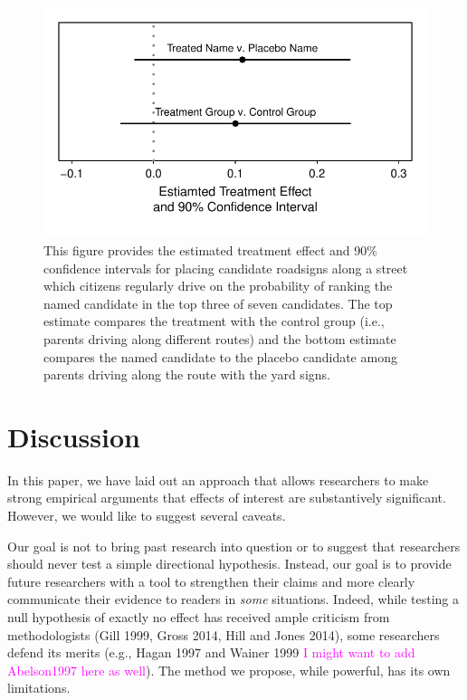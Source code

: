 \documentclass[12pt]{article}
\newcommand{\carlisle}[1]{\textcolor{magenta}{#1}}
\begin{document}
\begin{figure}[H]
\begin{center}
\includegraphics[scale = .8]{figs/kz-ci.pdf}
\caption{This figure provides the estimated treatment effect and 90\% confidence intervals for placing candidate roadsigns along a street which citizens regularly drive on the probability of ranking the named candidate in the top three of seven candidates. The top estimate compares the treatment with the control group (i.e., parents driving along different routes) and the bottom estimate compares the named candidate to the placebo candidate among parents driving along the route with the yard signs.}\label{fig:kz-ci}
\end{center}
\end{figure}

\section*{Discussion}

In this paper, we have laid out an approach that allows researchers to make strong empirical arguments that effects of interest are substantively significant. However, we would like to suggest several caveats.

Our goal is not to bring past research into question or to suggest that researchers should never test a simple directional hypothesis. Instead, our goal is to provide future researchers with a tool to strengthen their claims and more clearly communicate their evidence to readers in \textit{some} situations. Indeed, while testing a null hypothesis of exactly no effect has received ample criticism from methodologists (Gill 1999, Gross 2014, Hill and Jones 2014), some researchers defend its merits (e.g., Hagan 1997 and Wainer 1999 \carlisle{I might want to add Abelson1997 here as well}). The method we propose, while powerful, has its own limitations.
\end{document}

